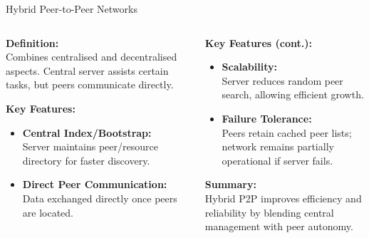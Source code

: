 \documentclass[aspectratio=169, table]{beamer}
\begin{document}
\begin{frame}{Hybrid Peer-to-Peer Networks}
	\vspace{20pt}
	\begin{columns}[t]
		
		\begin{column}{0.5\textwidth}
			\textbf{Definition:} \\
			Combines centralised and decentralised aspects. Central server assists certain tasks, but peers communicate directly.
			
			\vspace{10pt}
			\textbf{Key Features:}
			\begin{itemize}
				\item \textbf{Central Index/Bootstrap:} \\
				Server maintains peer/resource directory for faster discovery.
				
				\item \textbf{Direct Peer Communication:} \\
				Data exchanged directly once peers are located.
			\end{itemize}
		\end{column}
		
		\begin{column}{0.5\textwidth}
			\textbf{Key Features (cont.):}
			\begin{itemize}
				\item \textbf{Scalability:} \\
				Server reduces random peer search, allowing efficient growth.
				
				\item \textbf{Failure Tolerance:} \\
				Peers retain cached peer lists; network remains partially operational if server fails.
			\end{itemize}
			
			\vspace{10pt}
			\textbf{Summary:} \\
			Hybrid P2P improves efficiency and reliability by blending central management with peer autonomy.
		\end{column}
		
	\end{columns}
\end{frame}
\end{document}
